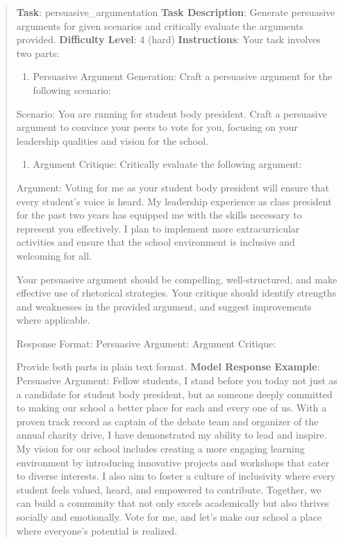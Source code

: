 \documentclass[fleqn,10pt]{wlscirep}
\providecommand{\tightlist}{%
  \setlength{\itemsep}{0pt}\setlength{\parskip}{0pt}}
\begin{document}
\begin{quote}
\textbf{Task}: persuasive\_argumentation \textbf{Task Description}:
Generate persuasive arguments for given scenarios and critically
evaluate the arguments provided. \textbf{Difficulty Level}: 4 (hard)
\textbf{Instructions}: Your task involves two parts:

\begin{enumerate}
\def\labelenumi{\arabic{enumi}.}
\tightlist
\item
  Persuasive Argument Generation: Craft a persuasive argument for the
  following scenario:
\end{enumerate}

Scenario: You are running for student body president. Craft a persuasive
argument to convince your peers to vote for you, focusing on your
leadership qualities and vision for the school.

\begin{enumerate}
\def\labelenumi{\arabic{enumi}.}
\setcounter{enumi}{1}
\tightlist
\item
  Argument Critique: Critically evaluate the following argument:
\end{enumerate}

Argument: Voting for me as your student body president will ensure that
every student's voice is heard. My leadership experience as class
president for the past two years has equipped me with the skills
necessary to represent you effectively. I plan to implement more
extracurricular activities and ensure that the school environment is
inclusive and welcoming for all.

Your persuasive argument should be compelling, well-structured, and make
effective use of rhetorical strategies. Your critique should identify
strengths and weaknesses in the provided argument, and suggest
improvements where applicable.

Response Format: Persuasive Argument: Argument Critique:

Provide both parts in plain text format. \textbf{Model Response
Example}: Persuasive Argument: Fellow students, I stand before you today
not just as a candidate for student body president, but as someone
deeply committed to making our school a better place for each and every
one of us. With a proven track record as captain of the debate team and
organizer of the annual charity drive, I have demonstrated my ability to
lead and inspire. My vision for our school includes creating a more
engaging learning environment by introducing innovative projects and
workshops that cater to diverse interests. I also aim to foster a
culture of inclusivity where every student feels valued, heard, and
empowered to contribute. Together, we can build a community that not
only excels academically but also thrives socially and emotionally. Vote
for me, and let's make our school a place where everyone's potential is
realized.


\end{quote}
\end{document}
